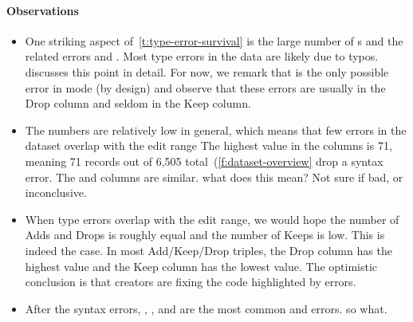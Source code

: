 \documentclass[english,submission,cleveref]{programming}
\begin{document}
\paragraph{Observations}

\begin{itemize}
  \item
    One striking aspect of~\cref{t:type-error-survival} is the large number
    of s and the related errors  and
    .
    Most type errors in the data are likely due to typos.
     discusses this point in detail.
    For now, we remark that  is the only possible error
    in \mnocheck{} mode (by design) and observe that these errors are
    usually in the Drop column and seldom in the Keep column.

  \item
    The numbers are relatively low in general, which means that
    few errors in the dataset overlap with the edit range
    The highest value in the \mstrict{} columns is 71, meaning 71 records
    out of 6,505 total~(\cref{f:dataset-overview} drop a syntax error.
    The \mnonstrict{} and \mnocheck{} columns are similar.
    \FILL{} what does this mean? Not sure if bad, or inconclusive.

  \item
    When type errors overlap with the edit range,
    we would hope the number of Adds and Drops is roughly
    equal and the number of Keeps is low.
    This is indeed the case.
    In most Add/Keep/Drop triples, the Drop column has the highest
    value and the Keep column has the lowest value.
    The optimistic conclusion is that creators are fixing the code
    highlighted by errors.


  \item
    After the syntax errors, ,
    , and  are the most common
    \mnonstrict{} and \mstrict{} errors.
    \FILL{} so what.


\end{itemize}
\end{document}
